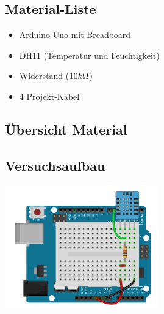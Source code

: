 \margininfo{}
\begin{multicols}{2}
\subsection*{Material-Liste}
\begin{itemize}
  \item Arduino Uno mit Breadboard
  \item DH11 (Temperatur und Feuchtigkeit)
  \item Widerstand ($10k\Omega$)
  \item 4 Projekt-Kabel
\end{itemize}

\subsection*{Übersicht Material}

\vfill\null 
\columnbreak

\subsection*{Versuchsaufbau}

\includegraphics[width=0.5\textwidth]{Kapitel2/Bilder/dh11test}
\end{multicols}


